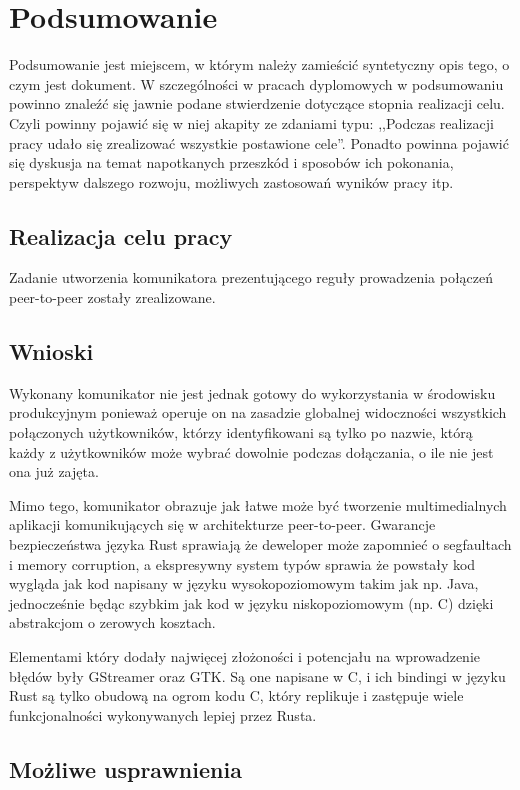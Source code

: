\chapter{Podsumowanie}
\label{chap:podsumowanie}
Podsumowanie jest miejscem, w którym należy zamieścić syntetyczny opis tego, o czym jest dokument. W
szczególności w pracach dyplomowych w podsumowaniu powinno znaleźć się jawnie podane stwierdzenie
dotyczące stopnia realizacji celu. Czyli powinny pojawić się w niej akapity ze zdaniami typu:
,,Podczas realizacji pracy udało się zrealizować wszystkie postawione cele''. Ponadto powinna
pojawić się dyskusja na temat napotkanych przeszkód i sposobów ich pokonania, perspektyw dalszego
rozwoju, możliwych zastosowań wyników pracy itp.

\section{Realizacja celu pracy}

Zadanie utworzenia komunikatora prezentującego reguły prowadzenia połączeń peer-to-peer zostały
zrealizowane.

\section{Wnioski}

Wykonany komunikator nie jest jednak gotowy do wykorzystania w środowisku produkcyjnym
ponieważ operuje on na zasadzie globalnej widoczności wszystkich połączonych użytkowników, którzy
identyfikowani są tylko po nazwie, którą każdy z użytkowników może wybrać dowolnie podczas
dołączania, o ile nie jest ona już zajęta.

Mimo tego, komunikator obrazuje jak łatwe może być tworzenie multimedialnych aplikacji
komunikujących się w architekturze peer-to-peer. Gwarancje bezpieczeństwa języka Rust sprawiają że
deweloper może zapomnieć o segfaultach i memory corruption, a ekspresywny system typów sprawia że
powstały kod wygląda jak kod napisany w języku wysokopoziomowym takim jak np. Java, jednocześnie
będąc szybkim jak kod w języku niskopoziomowym (np. C) dzięki abstrakcjom o zerowych kosztach.

Elementami który dodały najwięcej złożoności i potencjału na wprowadzenie błędów były GStreamer oraz
GTK. Są one napisane w C, i ich bindingi w języku Rust są tylko obudową na ogrom kodu C, który
replikuje i zastępuje wiele funkcjonalności wykonywanych lepiej przez Rusta.

\section{Możliwe usprawnienia}

